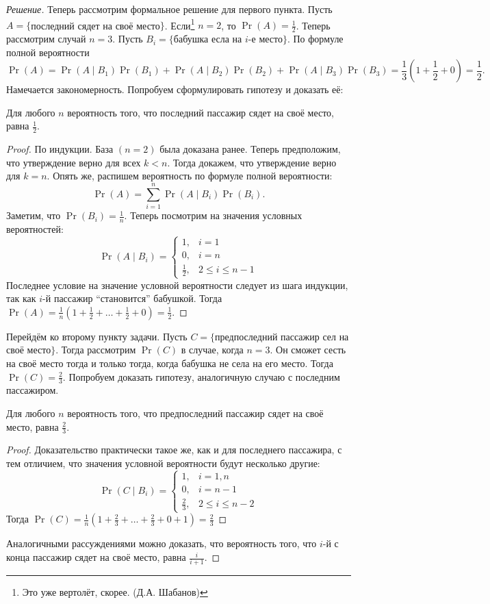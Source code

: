 \begin{proof}[Решение]
    Теперь рассмотрим формальное решение для первого пункта. Пусть \(A = \{\)последний сядет на своё место\(\}\). Если\footnote{Это уже вертолёт, скорее. (Д.А. Шабанов)} \(n = 2\), то \(\Pr(A) = \frac{1}{2}\). Теперь рассмотрим случай \(n = 3\). Пусть \(B_{i} = \{\)бабушка есла на \(i\)-е место\(\}\). По формуле полной вероятности \[\Pr(A) = \Pr(A \mid B_{1})\Pr(B_{1}) + \Pr(A \mid B_{2})\Pr(B_{2}) + \Pr(A \mid B_{3})\Pr(B_{3}) = \frac{1}{3}\left(1 + \frac{1}{2} + 0\right) = \frac{1}{2}.\]
    Намечается закономерность. Попробуем сформулировать гипотезу и доказать её:
    \begin{hypothesis}
        Для любого \(n\) вероятность того, что последний пассажир сядет на своё место, равна \(\frac{1}{2}\).
    \end{hypothesis}
    \begin{proof}
        По индукции. База \((n = 2)\) была доказана ранее. Теперь предположим, что утверждение верно для всех \(k < n\). Тогда докажем, что утверждение верно для \(k = n\). Опять же, распишем вероятность по формуле полной вероятности:
        \[\Pr(A) = \sum\limits_{i = 1}^{n} \Pr(A \mid B_i)\Pr(B_i).\]
        Заметим, что \(\Pr(B_i) = \frac{1}{n}\). Теперь посмотрим на значения условных вероятностей:
        \[\Pr(A \mid B_i) = \begin{cases}
        1, & i = 1 \\
        0, & i = n \\
        \frac{1}{2}, & 2 \leq i \leq n - 1
        \end{cases}\]
        Последнее условие на значение условной вероятности следует из шага индукции, так как \(i\)-й пассажир ``становится'' бабушкой. Тогда \(\Pr(A) = \frac{1}{n}\left(1 + \frac{1}{2} + \ldots + \frac{1}{2} + 0\right) = \frac{1}{2}\).
    \end{proof}
    Перейдём ко второму пункту задачи. Пусть \(C = \{\)предпоследний пассажир сел на своё место\(\}\). Тогда рассмотрим \(\Pr(C)\) в случае, когда \(n = 3\). Он сможет сесть на своё место тогда и только тогда, когда бабушка не села на его место. Тогда \(\Pr(C) = \frac{2}{3}\). Попробуем доказать гипотезу, аналогичную случаю с последним пассажиром.
    \begin{hypothesis}
        Для любого \(n\) вероятность того, что предпоследний пассажир сядет на своё место, равна \(\frac{2}{3}\).
    \end{hypothesis}
    \begin{proof}
        Доказательство практически такое же, как и для последнего пассажира, с тем отличием, что значения условной вероятности будут несколько другие:
        \[\Pr(C \mid B_i) = \begin{cases}
        1, & i = 1, n \\
        0, & i = n - 1 \\
        \frac{2}{3}, & 2 \leq i \leq n - 2
        \end{cases}\]
        Тогда \(\Pr(C) = \frac{1}{n}\left(1 + \frac{2}{3} + \ldots + \frac{2}{3} + 0 + 1\right) = \frac{2}{3}\)
    \end{proof}
    Аналогичными рассуждениями можно доказать, что вероятность того, что \(i\)-й с конца пассажир сядет на своё место, равна \(\frac{i}{i + 1}\).


\end{proof}
